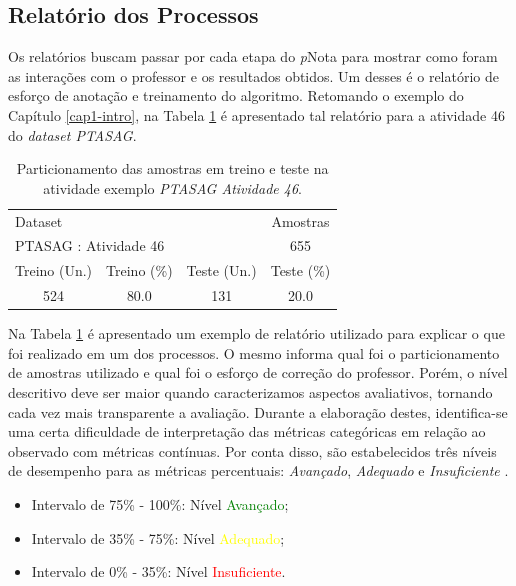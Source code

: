 \subsection{Relatório dos Processos}
\label{subsec-relatorio-processos}

Os relatórios buscam passar por cada etapa do \textit{p}Nota para mostrar como foram as interações com o professor e os resultados obtidos. Um desses é o relatório de esforço de anotação e treinamento do algoritmo. Retomando o exemplo do Capítulo \ref{cap1-intro}, na Tabela \ref{tab-ptasag-train-46} é apresentado tal relatório para a atividade 46 do \textit{dataset PTASAG}.

\begin{table}[!b]
\centering
\caption{Particionamento das amostras em treino e teste na atividade exemplo \textit{PTASAG Atividade 46}.}
\label{tab-ptasag-train-46}
\begin{tabular}{|c c c c|} \hline
\multicolumn{3}{|l}{Dataset} & Amostras\\ 

\multicolumn{3}{|l}{PTASAG : Atividade 46} & 655 \\ \hline 

Treino (Un.) & Treino (\%)  & Teste (Un.) & Teste (\%) \\ \hline 

524 & 80.0 & 131 & 20.0 \\ 

\hline \hline
\end{tabular}
\end{table}


Na Tabela \ref{tab-ptasag-train-46} é apresentado um exemplo de relatório utilizado para explicar o que foi realizado em um dos processos. O mesmo informa qual foi o particionamento de amostras utilizado e qual foi o esforço de correção do professor. Porém, o nível descritivo deve ser maior quando caracterizamos aspectos avaliativos, tornando cada vez mais transparente a avaliação. Durante a elaboração destes, identifica-se uma certa dificuldade de interpretação das métricas categóricas em relação ao observado com métricas contínuas. Por conta disso, são estabelecidos três níveis de desempenho para as métricas percentuais: \textit{Avançado}, \textit{Adequado} e \textit{Insuficiente} \cite{nascimento2020}.

\begin{itemize}
	\item Intervalo de 75\% - 100\%: Nível \textcolor{green}{Avançado};
	\item Intervalo de 35\% - 75\%: Nível \textcolor{yellow}{Adequado};
	\item Intervalo de 0\% - 35\%: Nível \textcolor{red}{Insuficiente}.
\end{itemize}


